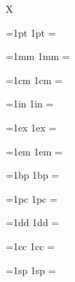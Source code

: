 \documentclass{article}
\begin{document}
X

\def\SHOW#1{%
	\dimen0=#1 %
	#1 = \the{}
}

\SHOW{1pt}

\SHOW{1mm}

\SHOW{1cm}

\SHOW{1in}

\SHOW{1ex}

\SHOW{1em}

\SHOW{1bp}

\SHOW{1pc}

\SHOW{1dd}

\SHOW{1cc}

\SHOW{1sp}

%
\newif\ifcomparewithtex
{}

\newcount\numErrors
\def\parsertest{\pgfutil@ifnextchar[\parsertest@{\parsertest@[]}}%
\def\parsertest@[#1]#2#3#4{%
	\begingroup
	\pgfqkeys{/ut}{#1}%
	\pgfluamathparse{#2}%
	\let\actual=\pgfmathresult
	\ifcomparewithtex
		\ifpgfluamathusedTeXfallback
			\let\expectedTeX=\actual
		\else
			\pgfmathparse{#2}%
			\let\expectedTeX=\pgfmathresult
		\fi
	\else
		\def\expectedTeX{--}%
	\fi
	\edef\expected{#3}%
	\def\success{1}%
	\ifx\expected\empty
		\ifx\actual\empty
		\else
			\def\success{0}%
		\fi
	\else
		\ifx\actual\expected
		\else
			\def\success{0}%
		\fi
	\fi
	\if1\success
	\else
		\message{FAILURE for #2 expected \expected\space but was \actual^^J}%
		\global\advance\numErrors by1
	\fi
	\if1\success
		\if1#4%
			\ifpgfmathunitsdeclared
			\else
				\def\success{0}%
			\fi
		\else
			\ifpgfmathunitsdeclared
				\def\success{0}%
			\fi
		\fi
		\if1\success
		\else
			\message{FAILURE for #2 expected units declared #4 but was \ifpgfmathunitsdeclared true\else false\fi^^J}%
			\global\advance\numErrors by1
		\fi
	\fi
	\if1\success
		\ifcomparewithtex
			\dimen0=\actual pt %
			\dimen1=\expectedTeX pt %
			\advance\dimen0 by-\dimen1
			\ifdim\dimen0<0sp
				\dimen0=-\dimen0
			\fi
			\ifdim\dimen0 > 0.004pt %
				\def\success{0}%
				\message{FAILURE for #2 : matches expectations, but does NOT match TeX output (error \the\dimen0). expected \expectedTeX\space but was \actual^^J}%
				\global\advance\numErrors by1
			\fi
		\fi
	\fi
	\message{#2 = \actual\space (pgf=\expectedTeX) \if1\success OK\else FAILURE\fi^^J}%
	\endgroup
}%
\end{document}

